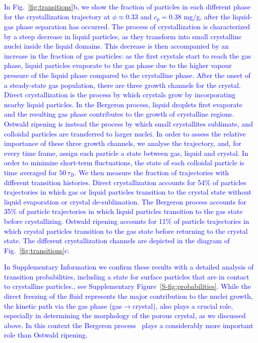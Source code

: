 \documentclass[preprint,amsmath,amssymb,superscriptaddress]{revtex4-1}
\begin{document}
\textcolor{blue}{
In Fig.~\ref{fig:transitions}b, we show  the fraction of particles in each different phase for the crystallization trajectory at
$\phi\approx 0.33$ and $c_p=0.38$ mg/g, after the liquid-gas phase separation has occurred.
The process of crystallization is characterized 
by a steep decrease in liquid particles, as they transform into small crystalline nuclei inside the liquid domains. This decrease
is then accompanied by an increase in the fraction of gas particles: as the first crystals start to reach the gas phase, liquid particles evaporate 
to the gas phase due to the higher vapour pressure of the liquid phase compared to the crystalline phase. After the onset 
of a steady-state gas population, there are three growth channels for the crystal. Direct crystallization is the process by which 
crystals grow by incorporating nearby liquid particles. In the Bergeron process, liquid droplets first evaporate and the resulting gas phase 
contributes to the growth of crystalline regions. Ostwald ripening is instead the process by which small crystallites sublimate, and colloidal
particles are transferred to larger nuclei. In order to assess the relative importance of these three growth channels, we analyse the trajectory, and, for every time frame, assign each particle a state between gas, liquid and crystal. In order to minimize short-term fluctuations, the state of each colloidal particle is time averaged for $50\,\tau_B$. We then measure the fraction of trajectories with different transition histories.
Direct crystallization accounts for 54\% of particles trajectories in which
gas or liquid particles transition to the crystal state without liquid evaporation or crystal de-sublimation. The Bergeron process accounts for 35\% of particle trajectories in which liquid particles
transition to the gas state before crystallizing. Ostwald ripening accounts for 11\% of particle trajectories in which crystal particles transition to the gas state before returning
to the crystal state. The different crystallization channels are depicted in the diagram of Fig.~\ref{fig:transitions}c.}

\textcolor{blue}{
In Supplementary Information we confirm these results with a detailed analysis of transition probabilities, including a state for surface particles that are in contact 
to crystalline particles., see Supplementary Figure~\ref{S-fig:probabilities}.
While the direct freezing of the fluid represents the major contribution to the nuclei growth, the kinetic path via the gas phase (gas$\rightarrow$crystal), also plays a crucial role,
especially in determining the morphology of the porous crystal, as we discussed above. In this context the Bergeron process~\cite{glickman2000glossary,morrison2012resilience}
plays a considerably more important role than Ostwald ripening.}
\end{document}
